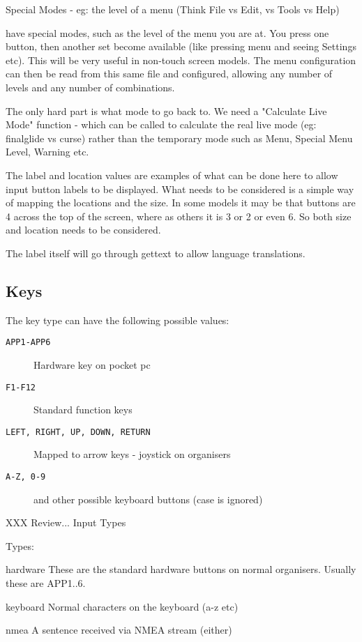 Special Modes - eg: the level of a menu (Think File vs Edit, vs Tools vs Help)

have special modes, such as
the level of the menu you are at. You press one button, then another
set become available (like pressing menu and seeing Settings etc). This
will be very useful in non-touch screen models. The menu configuration
can then be read from this same file and configured, allowing any
number of levels and any number of combinations.

The only hard part is what mode to go back to. We need a
"Calculate Live Mode" function - which can be called to calculate the
real live mode (eg: finalglide vs curse) rather than the temporary
mode such as Menu, Special Menu Level, Warning etc.

The label and location values are examples of what can be done here
to allow input button labels to be displayed. What needs to be
considered is a simple way of mapping the locations and the size.
In some models it may be that buttons are 4 across the top of the
screen, where as others it is 3 or 2 or even 6. So both size and
location needs to be considered.

The label itself will go through gettext to allow language
translations.

\subsection{Keys}

The key type can have the following possible values:

\begin{description}
\item[\texttt{APP1-APP6}] Hardware key on pocket pc
\item[\texttt{F1-F12}] Standard function keys
\item[\texttt{LEFT, RIGHT, UP, DOWN, RETURN}] Mapped to arrow keys - joystick on
  organisers
\item[\texttt{A-Z, 0-9}] and other possible keyboard buttons (case is ignored)
\end{description}


XXX Review...
Input Types

Types:

hardware	These are the standard hardware buttons
on normal organisers. Usually these are
APP1..6.

keyboard	Normal characters on the keyboard (a-z etc)

nmea		A sentence received via NMEA stream (either)

